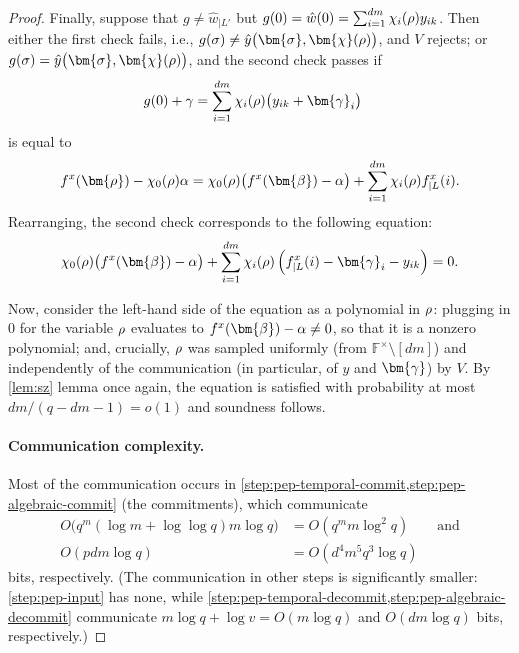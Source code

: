 \documentclass[10pt,a4paper]{article}
\newif\iflipics\lipicsfalse
\theoremstyle{definition}
\newcommand{\field}{\mathbb{F}}
\newcommand{\vcommitlength}{v}
\newcommand{\pcommitlength}{p}
\newcommand{\pcommitstring}{y}
\newcommand{\dimension}{m}
\newcommand{\degree}{d}
\newcommand{\fieldsize}{q}
\newcommand{\evaluationpoint}{\bm{\fe2}}
\newcommand{\fingerprinttuple}{\bm{\rho}}
\newcommand{\Fingerprinttuple}{\bm{\sigma}}
\renewcommand{\line}{L}
\def\fe#1{
    \ifnum#1=1
        \alpha
    \else
    \ifnum#1=2
        \beta
    \else
    \ifnum#1=3
        \gamma
    \fi\fi\fi
}
\def\rfe#1{
    \ifnum#1=1
        \rho
    \else
    \ifnum#1=2
        \sigma
    \else
    \fi\fi
}
\begin{document}
\begin{proof}
    Finally, suppose that $g \neq \hat w_{|\line'}$ but $g(0) = \hat w(0) = \sum_{i = 1}^{\degree\dimension}\chi_i(\rfe1) \pcommitstring_{ik}$. Then either the first check fails, i.e., $g(\rfe2) \neq \hat \pcommitstring\big(\Fingerprinttuple, \bm{\chi}(\rfe1)\big)$, and $V$ rejects; or $g(\rfe2) = \hat \pcommitstring\big(\Fingerprinttuple, \bm{\chi}(\rfe1)\big)$, and the second check passes if
    \begin{align*}
        g(0) + \fe3 &= \sum_{i = 1}^{\degree\dimension}\chi_i(\rfe1)\big( \pcommitstring_{ik} + \bm{\fe3}_i\big)
    \end{align*}
    is equal to
    \begin{equation*}
        f^x(\fingerprinttuple) - \chi_0(\rfe1) \fe1 = \chi_0(\rfe1) \big(f^x(\evaluationpoint) - \fe1\big) + \sum_{i = 1}^{\degree\dimension}\chi_i(\rfe1) f^x_{|\line}(i).
    \end{equation*}
    Rearranging, the second check corresponds to the following equation:
    \begin{equation*}
        \chi_0(\rfe1) \big(f^x(\evaluationpoint) - \fe1\big) + \sum_{i = 1}^{\degree\dimension} \chi_i(\rfe1)\left(f^x_{|\line}(i) - \bm{\fe3}_i - \pcommitstring_{ik}\right) = 0.
    \end{equation*}
    
    Now, consider the left-hand side of the equation as a polynomial in $\rfe1$: plugging in $0$ for the variable $\rfe1$ evaluates to $f^x(\evaluationpoint) - \fe1 \neq 0$, so that it is a nonzero polynomial; and, crucially, $\rfe1$ was sampled uniformly (from $\field^\times \setminus [\degree\dimension]$) and independently of the communication (in particular, of $\pcommitstring$ and $\bm{\fe3}$) by $V$. By \cref{lem:sz} lemma once again, the equation is satisfied with probability at most $\degree\dimension/(\fieldsize - \degree\dimension - 1) = o(1)$ and soundness follows.

    \paragraph*{Communication complexity\iflipics\else.\fi} Most of the communication occurs in \cref{step:pep-temporal-commit,step:pep-algebraic-commit} (the commitments), which communicate
    \begin{align*}
        O\big(\fieldsize^\dimension (\log \dimension + \log\log \fieldsize) \dimension \log \fieldsize\big) &= O\left(\fieldsize^{\dimension} \dimension \log^2 \fieldsize\right) \qquad \text{and}\\
        O\left(\pcommitlength \degree\dimension \log \fieldsize\right) &= O\left(\degree^4\dimension^5\fieldsize^3 \log \fieldsize\right)
    \end{align*}
    bits, respectively. (The communication in other steps is significantly smaller: \cref{step:pep-input} has none, while \cref{step:pep-temporal-decommit,step:pep-algebraic-decommit} communicate $\dimension \log \fieldsize + \log \vcommitlength = O(\dimension \log \fieldsize)$ and $O(\degree\dimension \log \fieldsize)$ bits, respectively.)


\end{proof}
\end{document}
